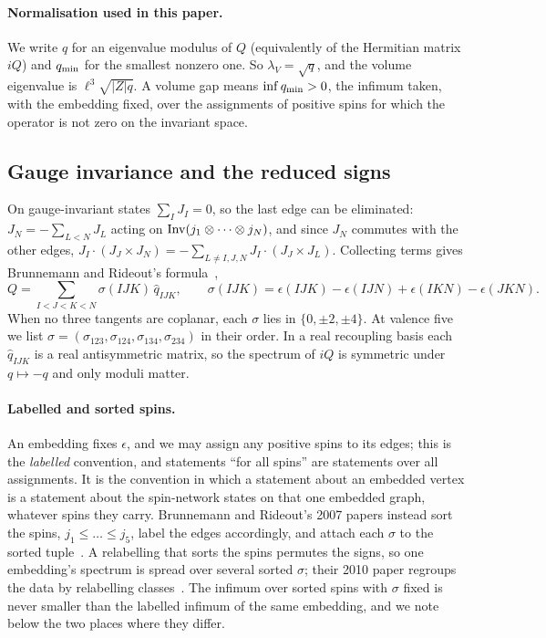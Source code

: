 \paragraph{Normalisation used in this paper.}
We write $q$ for an eigenvalue modulus of $Q$ (equivalently of the Hermitian matrix
$iQ$) and $q_{\min}$ for the smallest nonzero one. So $\lambda_V=\sqrt q$, and the
volume eigenvalue is $\ell^3\sqrt{|Z|q}$. A volume gap means $\inf q_{\min}>0$, the
infimum taken, with the embedding fixed, over the assignments of positive spins for which
the operator is not zero on the invariant space.

\subsection{Gauge invariance and the reduced signs}

On gauge-invariant states $\sum_IJ_I=0$, so the last edge can be eliminated:
$J_N=-\sum_{L<N}J_L$ acting on $\operatorname{Inv}(j_1\otimes\cdots\otimes j_N)$, and since $J_N$
commutes with the other edges, $J_I\cdot(J_J\times J_N)=-\sum_{L\ne I,J,N}J_I\cdot
(J_J\times J_L)$. Collecting terms gives Brunnemann and Rideout's
formula~\cite[eq.~(4.12)]{BR2008b},
\begin{equation}\label{eq:sigma}
  Q=\sum_{I<J<K<N}\sigma(IJK)\,\hat q_{IJK},\qquad
  \sigma(IJK)=\epsilon(IJK)-\epsilon(IJN)+\epsilon(IKN)-\epsilon(JKN).
\end{equation}
When no three tangents are coplanar, each $\sigma$ lies in $\{0,\pm2,\pm4\}$. At valence five we list
$\sigma=(\sigma_{123},\sigma_{124},\sigma_{134},\sigma_{234})$ in their order.
In a real recoupling basis each $\hat q_{IJK}$ is a real antisymmetric matrix, so the
spectrum of $iQ$ is symmetric under $q\mapsto-q$ and only moduli matter.

\paragraph{Labelled and sorted spins.}
An embedding fixes $\epsilon$, and we may assign any positive spins to its edges; this is the
\emph{labelled} convention, and statements ``for all spins'' are statements over all
assignments. It is the convention in which a statement about an embedded vertex is a
statement about the spin-network states on that one embedded graph, whatever spins
they carry. Brunnemann and Rideout's 2007 papers instead sort the spins,
$j_1\le\dots\le j_5$, label the edges accordingly, and attach each $\sigma$ to the
sorted tuple~\cite{BR2008b}. A relabelling that sorts the spins permutes the signs,
so one embedding's spectrum is spread over several sorted $\sigma$; their 2010
paper regroups the data by relabelling classes~\cite{BR2010}. The infimum over sorted
spins with $\sigma$ fixed is never smaller than the labelled infimum of the same
embedding, and we note below the two places where they differ.

